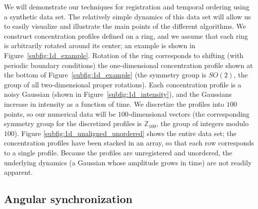 \documentclass[12pt]{article}
\begin{document}
We will demonstrate our techniques for registration and temporal ordering using a synthetic data set.
%
The relatively simple dynamics of this data set will allow us to easily visualize and illustrate the main points of the different algorithms.
%
We construct concentration profiles defined on a ring, and we assume that each ring is arbitrarily rotated around its center; an example is shown in Figure~\ref{subfig:1d_example}.
%
Rotation of the ring corresponds to shifting (with periodic boundary conditions) the one-dimensional concentration profile shown at the bottom of Figure~\ref{subfig:1d_example} (the symmetry group is $SO(2)$, the group of all two-dimensional proper rotations).
%
Each concentration profile is a noisy Gaussian (shown in Figure~\ref{subfig:1d_intensity}), and the Gaussians increase in intensity as  a function of time.
%
We discretize the profiles into $100$ points, so our numerical data will be $100$-dimensional vectors (the corresponding symmetry group for the discretized profiles is $\mathbb{Z}_{100}$, the group of integers modulo $100$).
%
Figure \ref{subfig:1d_unaligned_unordered} shows the entire data set; the concentration profiles have been stacked in an array, so that each row corresponds to a single profile.
%
Because the profiles are unregistered and unordered, the underlying dynamics (a Gaussian whose amplitude grows in time) are not readily apparent.

\subsection{Angular synchronization \cite{singer2011angular}}
\end{document}
